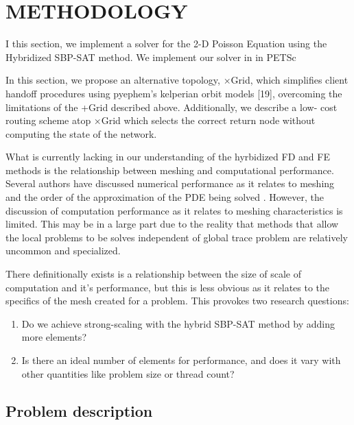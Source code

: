 % 
% 
%
\section{METHODOLOGY}

I this section, we implement a solver for the 2-D Poisson Equation using the Hybridized SBP-SAT method. We implement our solver in  in {\color{red}PETSc}

In this section, we propose an alternative topology, ×Grid, which simplifies client handoff procedures using pyephem’s kelperian orbit models [19], overcoming the limitations of the +Grid described above. Additionally, we describe a low- cost routing scheme atop ×Grid which selects the correct return node without computing the state of the network.


What is currently lacking in our understanding of the hyrbidized FD and 
FE methods is the relationship between meshing and computational performance. Several authors have discussed numerical performance as it relates to meshing and
the order of the approximation of the PDE being solved \citep{}. However, the discussion of computation performance as it relates to meshing characteristics is limited. This may be in a large part due to the reality that methods that allow the local problems to be solves independent of global trace problem are relatively 
uncommon and specialized. 

There definitionally exists is a relationship between the size of scale of computation and it's performance, but this is less obvious as it relates
to the specifics of the mesh created for a problem. This provokes two 
research questions:

\begin{enumerate}[label=\textbf{\footnotesize RQ\arabic*.}]
	\item {Do we achieve strong-scaling with the hybrid \mbox{SBP-SAT} 
		   method by adding more elements?}
	\item {Is there an ideal number of elements for performance, and does it 
		   vary with other quantities like problem size or thread count?}
\end{enumerate}

\subsection{Problem description} %

